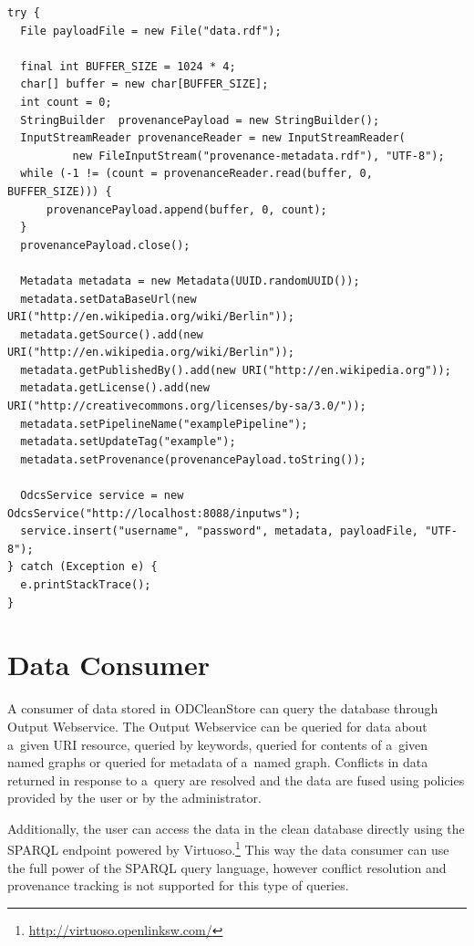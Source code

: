 \begin{lstlisting}[caption={Example usage of Input Webservice client library},label=lst:clientLibrary]
try {
  File payloadFile = new File("data.rdf");

  final int BUFFER_SIZE = 1024 * 4;
  char[] buffer = new char[BUFFER_SIZE];
  int count = 0;
  StringBuilder  provenancePayload = new StringBuilder();
  InputStreamReader provenanceReader = new InputStreamReader(
          new FileInputStream("provenance-metadata.rdf"), "UTF-8");
  while (-1 != (count = provenanceReader.read(buffer, 0, BUFFER_SIZE))) {
      provenancePayload.append(buffer, 0, count);
  }
  provenancePayload.close();

  Metadata metadata = new Metadata(UUID.randomUUID());
  metadata.setDataBaseUrl(new URI("http://en.wikipedia.org/wiki/Berlin"));
  metadata.getSource().add(new URI("http://en.wikipedia.org/wiki/Berlin"));
  metadata.getPublishedBy().add(new URI("http://en.wikipedia.org"));
  metadata.getLicense().add(new URI("http://creativecommons.org/licenses/by-sa/3.0/")); 
  metadata.setPipelineName("examplePipeline");
  metadata.setUpdateTag("example"); 
  metadata.setProvenance(provenancePayload.toString()); 

  OdcsService service = new OdcsService("http://localhost:8088/inputws");
  service.insert("username", "password", metadata, payloadFile, "UTF-8");
} catch (Exception e) {
  e.printStackTrace();
}
\end{lstlisting}

\section{Data Consumer}
\label{sec:outputWS}

A consumer of data stored in ODCleanStore can query the database through Output Webservice. The Output Webservice can be queried for data about a~given URI resource, queried by keywords, queried for contents of a~given named graphs or queried for metadata of a~named graph. Conflicts in data returned in response to a~query are resolved and the data are fused using policies provided by the user or by the administrator.

Additionally, the user can access the data in the clean database directly using the SPARQL endpoint powered by Virtuoso.\footnote{\url{http://virtuoso.openlinksw.com/}} This way the data consumer can use the full power of the SPARQL query language, however conflict resolution and provenance tracking is not supported for this type of queries.

